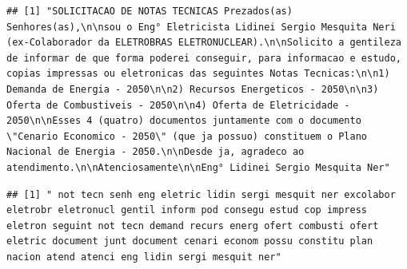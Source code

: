 \documentclass[]{article}
\newenvironment{Shaded}{\begin{snugshade}}{\end{snugshade}}
\newcommand{\DecValTok}[1]{\textcolor[rgb]{0.00,0.00,0.81}{#1}}
\newcommand{\KeywordTok}[1]{\textcolor[rgb]{0.13,0.29,0.53}{\textbf{#1}}}
\newcommand{\NormalTok}[1]{#1}
\newcommand{\OperatorTok}[1]{\textcolor[rgb]{0.81,0.36,0.00}{\textbf{#1}}}
\begin{document}
\begin{Shaded}
\end{Shaded}

\begin{verbatim}
## [1] "SOLICITACAO DE NOTAS TECNICAS Prezados(as) Senhores(as),\n\nsou o Eng° Eletricista Lidinei Sergio Mesquita Neri (ex-Colaborador da ELETROBRAS ELETRONUCLEAR).\n\nSolicito a gentileza de informar de que forma poderei conseguir, para informacao e estudo, copias impressas ou eletronicas das seguintes Notas Tecnicas:\n\n1) Demanda de Energia - 2050\n\n2) Recursos Energeticos - 2050\n\n3) Oferta de Combustiveis - 2050\n\n4) Oferta de Eletricidade - 2050\n\nEsses 4 (quatro) documentos juntamente com o documento \"Cenario Economico - 2050\" (que ja possuo) constituem o Plano Nacional de Energia - 2050.\n\nDesde ja, agradeco ao atendimento.\n\nAtenciosamente\n\nEng° Lidinei Sergio Mesquita Ner"
\end{verbatim}

\begin{Shaded}
\end{Shaded}

\begin{verbatim}
## [1] " not tecn senh eng eletric lidin sergi mesquit ner excolabor eletrobr eletronucl gentil inform pod consegu estud cop impress eletron seguint not tecn demand recurs energ ofert combusti ofert eletric document junt document cenari econom possu constitu plan nacion atend atenci eng lidin sergi mesquit ner"
\end{verbatim}

\begin{Shaded}
\end{Shaded}
\end{document}
